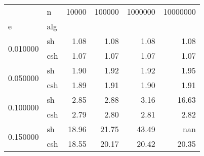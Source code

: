 \begin{tabular}{llrrrr}
 & n & 10000 & 100000 & 1000000 & 10000000 \\
e & alg &  &  &  &  \\
\multirow[c]{2}{*}{0.010000} & sh & 1.08 & 1.08 & 1.08 & 1.08 \\
 & csh & 1.07 & 1.07 & 1.07 & 1.07 \\
\multirow[c]{2}{*}{0.050000} & sh & 1.90 & 1.92 & 1.92 & 1.95 \\
 & csh & 1.89 & 1.91 & 1.90 & 1.91 \\
\multirow[c]{2}{*}{0.100000} & sh & 2.85 & 2.88 & 3.16 & 16.63 \\
 & csh & 2.79 & 2.80 & 2.81 & 2.82 \\
\multirow[c]{2}{*}{0.150000} & sh & 18.96 & 21.75 & 43.49 & nan \\
 & csh & 18.55 & 20.17 & 20.42 & 20.35 \\
\end{tabular}
